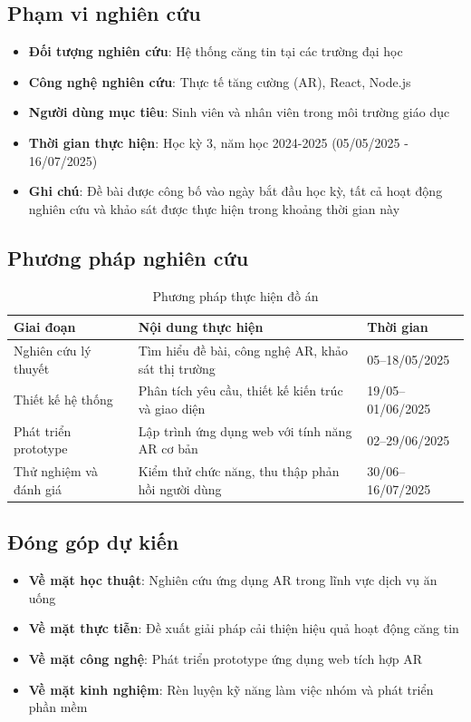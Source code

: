 \documentclass[12pt,a4paper]{article}
\begin{document}
\subsection*{Phạm vi nghiên cứu}
\begin{itemize}[leftmargin=1cm]
    \item \textbf{Đối tượng nghiên cứu}: Hệ thống căng tin tại các trường đại học
    \item \textbf{Công nghệ nghiên cứu}: Thực tế tăng cường (AR), React, Node.js
    \item \textbf{Người dùng mục tiêu}: Sinh viên và nhân viên trong môi trường giáo dục
    \item \textbf{Thời gian thực hiện}: Học kỳ 3, năm học 2024-2025 (05/05/2025 - 16/07/2025)
    \item \textbf{Ghi chú}: Đề bài được công bố vào ngày bắt đầu học kỳ, tất cả hoạt động nghiên cứu và khảo sát được thực hiện trong khoảng thời gian này
\end{itemize}

\subsection*{Phương pháp nghiên cứu}
\begin{table}[H]
\centering
\begin{tabular}{@{}p{3cm}p{6cm}p{3cm}@{}}
\toprule
\textbf{Giai đoạn} & \textbf{Nội dung thực hiện} & \textbf{Thời gian} \\
\midrule
Nghiên cứu lý thuyết & Tìm hiểu đề bài, công nghệ AR, khảo sát thị trường & 05--18/05/2025 \\
Thiết kế hệ thống & Phân tích yêu cầu, thiết kế kiến trúc và giao diện & 19/05--01/06/2025 \\
Phát triển prototype & Lập trình ứng dụng web với tính năng AR cơ bản & 02--29/06/2025 \\
Thử nghiệm và đánh giá & Kiểm thử chức năng, thu thập phản hồi người dùng & 30/06--16/07/2025 \\
\bottomrule
\end{tabular}
\caption{Phương pháp thực hiện đồ án}
\end{table}

\subsection*{Đóng góp dự kiến}
\begin{itemize}[leftmargin=1cm]
    \item \textbf{Về mặt học thuật}: Nghiên cứu ứng dụng AR trong lĩnh vực dịch vụ ăn uống
    \item \textbf{Về mặt thực tiễn}: Đề xuất giải pháp cải thiện hiệu quả hoạt động căng tin
    \item \textbf{Về mặt công nghệ}: Phát triển prototype ứng dụng web tích hợp AR
    \item \textbf{Về mặt kinh nghiệm}: Rèn luyện kỹ năng làm việc nhóm và phát triển phần mềm
\end{itemize}
\end{document}
